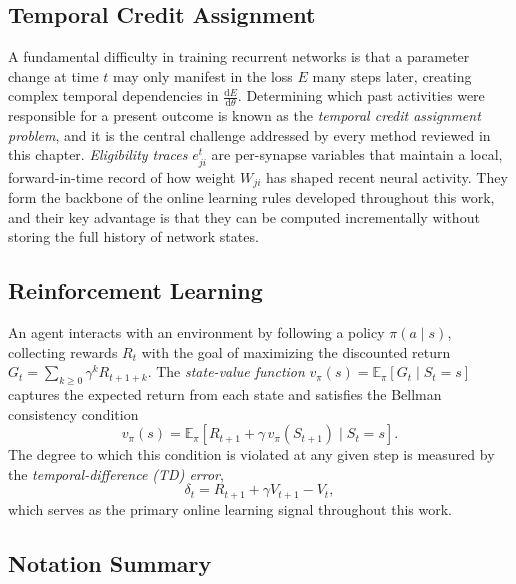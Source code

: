 \subsection{Temporal Credit Assignment}

A fundamental difficulty in training recurrent networks is that a parameter
change at time $t$ may only manifest in the loss $E$ many steps later,
creating complex temporal dependencies in $\frac{\mathrm{d}E}{\mathrm{d}\theta}$.
Determining which past activities were responsible for a present outcome is
known as the \emph{temporal credit assignment problem}, and it is the central
challenge addressed by every method reviewed in this chapter.
\emph{Eligibility traces} $e^t_{ji}$ are per-synapse variables that maintain
a local, forward-in-time record of how weight $W_{ji}$ has shaped recent
neural activity. They form the backbone of the online learning rules
developed throughout this work, and their key advantage is that they can be
computed incrementally without storing the full history of network states.

\subsection{Reinforcement Learning}

An agent interacts with an environment by following a policy
$\pi(a \mid s)$, collecting rewards $R_t$ with the goal of maximizing the
discounted return $G_t = \sum_{k \geq 0} \gamma^k R_{t+1+k}$. The
\emph{state-value function} $v_\pi(s) = \mathbb{E}_\pi[G_t \mid S_t = s]$
captures the expected return from each state and satisfies the Bellman
consistency condition
\begin{equation}
    v_\pi(s) = \mathbb{E}_\pi\!\left[R_{t+1} + \gamma\, v_\pi(S_{t+1})
    \mid S_t = s\right].
\end{equation}
The degree to which this condition is violated at any given step is measured
by the \emph{temporal-difference (TD) error},
\begin{equation}
    \delta_t = R_{t+1} + \gamma V_{t+1} - V_t,
\end{equation}
which serves as the primary online learning signal throughout this work.

\subsection{Notation Summary}

